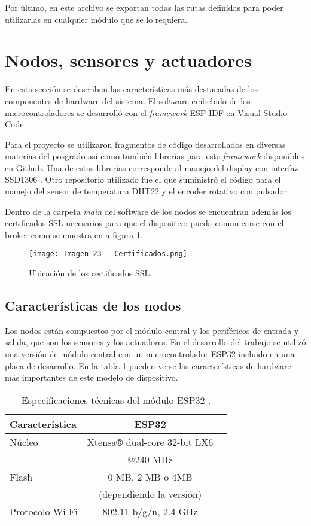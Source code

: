 Por último, en este archivo se exportan todas las rutas definidas para poder utilizarlas en cualquier módulo que se lo requiera.

\section{Nodos, sensores y actuadores}

En esta sección se describen las características más destacadas de los componentes de hardware del sistema. El software embebido de los microcontroladores se desarrolló con el \textit{framework} ESP-IDF \citep{27} en Visual Studio Code.

Para el proyecto se utilizaron fragmentos de código desarrollados en diversas materias del posgrado así como también librerías para este \textit{framework} disponibles en Github. Una de estas librerías corresponde al manejo del display con interfaz SSD1306 \citep{28}. Otro repositorio utilizado fue el que suministró el código para el manejo del sensor de temperatura DHT22 y el encoder rotativo con pulsador \citep{29}.

Dentro de la carpeta \textit{main} del software de los nodos se encuentran además los certificados SSL necesarios para que el dispositivo pueda comunicarse con el broker como se muestra en a figura \ref{fig:23}.

\begin{figure}[h]
\centering
\texttt{[image: Imagen 23 - Certificados.png]}
\caption[Certificados]{Ubicación de los certificados SSL.}
\label{fig:23}
\end{figure}

\subsection{Características de los nodos}

Los nodos están compuestos por el módulo central y los periféricos de entrada y salida, que son los sensores y los actuadores. En el desarrollo del trabajo se utilizó una versión de módulo central con un microcontrolador ESP32 incluido en una placa de desarrollo. En la tabla \ref{tab:esp32} pueden verse las características de hardware más importantes de este modelo de dispositivo.

\begin{table}[h]
\centering
\caption[Módulos ESP32]{Especificaciones técnicas del módulo ESP32 \citep{30}.}
\begin{tabular}{l c c}
\toprule
\textbf{Característica} & \textbf{ESP32}\\
\midrule
Núcleo			& Xtensa® dual-core 32-bit LX6\\
				& @240 MHz\\
Flash			& 0 MB, 2 MB o 4MB\\
				& (dependiendo la versión)\\
Protocolo Wi-Fi	& 802.11 b/g/n, 2.4 GHz\\
\bottomrule
\hline
\end{tabular}
\label{tab:esp32}
\end{table}

